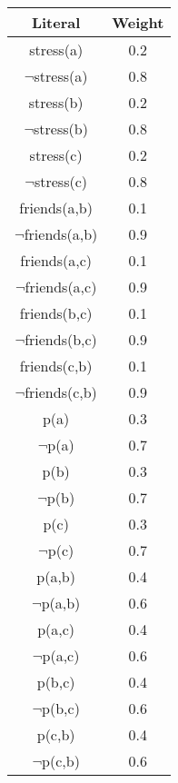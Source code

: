 \begin{center}
\begin{tabular}{c|c}
Literal & Weight \\
\hline
stress(a) & 0.2 \\
$\lnot$stress(a) & 0.8 \\
stress(b) & 0.2 \\
$\lnot$stress(b) & 0.8 \\
stress(c) & 0.2 \\
$\lnot$stress(c) & 0.8 \\
friends(a,b) & 0.1 \\
$\lnot$friends(a,b) & 0.9 \\
friends(a,c) & 0.1 \\
$\lnot$friends(a,c) & 0.9 \\
friends(b,c) & 0.1 \\
$\lnot$friends(b,c) & 0.9 \\
friends(c,b) & 0.1 \\
$\lnot$friends(c,b) & 0.9 \\
p(a) & 0.3 \\
$\lnot$p(a) & 0.7 \\
p(b) & 0.3 \\
$\lnot$p(b) & 0.7 \\
p(c) & 0.3 \\
$\lnot$p(c) & 0.7 \\
p(a,b) & 0.4 \\
$\lnot$p(a,b) & 0.6 \\
p(a,c) & 0.4 \\
$\lnot$p(a,c) & 0.6 \\
p(b,c) & 0.4 \\
$\lnot$p(b,c) & 0.6 \\
p(c,b) & 0.4 \\
$\lnot$p(c,b) & 0.6 \\
\end{tabular}
\end{center}

